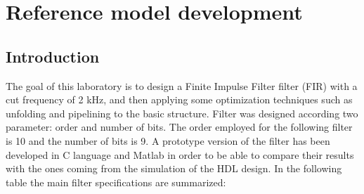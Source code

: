%

\chapter{Reference model development}
\label{chap1}
\graphicspath{ {./chapters/chap1images/} }
\section{Introduction}

The goal of this laboratory is to design a Finite Impulse Filter filter (FIR) with a cut frequency of 2 kHz, and then applying some optimization 
techniques such as unfolding and pipelining to the basic structure.
Filter was designed according two parameter: order and number of bits. The order employed for the following filter
is 10 and the number of bits is 9.
A prototype version of the filter has been developed in C language and Matlab in order to be able to compare their results with the
ones coming from the simulation of the HDL design.
In the following table the main filter specifications are summarized:

%

